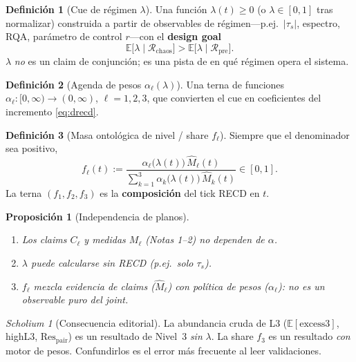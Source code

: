 \documentclass[11pt,a4paper]{article}
\theoremstyle{definition}
\newtheorem{definition}{Definici\'on}[section]
\theoremstyle{plain}
\newtheorem{proposition}{Proposici\'on}[section]
\theoremstyle{remark}
\newtheorem{scholium}{Scholium}[section]
\newcommand{\Res}{\mathrm{Res}}
\newcommand{\excess}{\mathrm{excess3}}
\begin{document}
\begin{definition}[Cue de r\'egimen $\lambda$]
\label{def:lambda}
Una funci\'on $\lambda(t)\ge 0$ (o $\lambda\in[0,1]$ tras normalizar)
construida a partir de observables de r\'egimen---p.ej.\ $|\tau_s|$,
espectro, RQA, par\'ametro de control $r$---con el
\textbf{design goal}
\begin{equation}
\label{eq:goal}
\mathbb{E}\bigl[\lambda\mid\mathcal{R}_{\mathrm{chaos}}\bigr]
>
\mathbb{E}\bigl[\lambda\mid\mathcal{R}_{\mathrm{pre}}\bigr].
\end{equation}
$\lambda$ \emph{no} es un claim de conjunción; es una pista de en qu\'e
r\'egimen opera el sistema.
\end{definition}

\begin{definition}[Agenda de pesos $\alpha_\ell(\lambda)$]
\label{def:alpha}
Una terna de funciones
$\alpha_\ell:[0,\infty)\to(0,\infty)$, $\ell=1,2,3$, que convierten el
cue en coeficientes del incremento \eqref{eq:drecd}.
\end{definition}

\begin{definition}[Masa ontológica de nivel / share $f_\ell$]
\label{def:f}
Siempre que el denominador sea positivo,
\begin{equation}
\label{eq:f}
f_\ell(t)
:=\frac{\alpha_\ell\bigl(\lambda(t)\bigr)\,\widehat{M}_\ell(t)}
{\sum_{k=1}^{3}\alpha_k\bigl(\lambda(t)\bigr)\,\widehat{M}_k(t)}
\in[0,1].
\end{equation}
La terna $(f_1,f_2,f_3)$ es la \textbf{composici\'on} del tick RECD en $t$.
\end{definition}

\begin{proposition}[Independencia de planos]
\label{prop:indep}
\begin{enumerate}[label=(\roman*)]
  \item Los claims $C_\ell$ y medidas $M_\ell$ (Notas 1--2) no dependen de
  $\alpha$.
  \item $\lambda$ puede calcularse sin RECD (p.ej.\ solo $\tau_s$).
  \item $f_\ell$ mezcla \emph{evidencia de claims} ($\widehat{M}_\ell$)
  con \emph{pol\'itica de pesos} ($\alpha_\ell$): no es un observable
  puro del joint.
\end{enumerate}
\end{proposition}

\begin{scholium}[Consecuencia editorial]
La abundancia cruda de L3 ($\mathbb{E}[\excess]$, highL3,
$\Res_{\mathrm{pair}}$) es un resultado de Nivel~3 \emph{sin} $\lambda$.
La share $f_3$ es un resultado \emph{con} motor de pesos. Confundirlos
es el error m\'as frecuente al leer validaciones.
\end{scholium}
\end{document}
